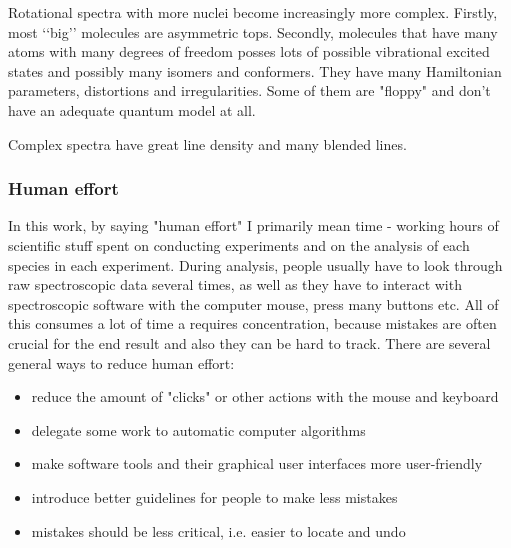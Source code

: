 Rotational spectra with more nuclei become increasingly more complex. Firstly, most \lq\lq{}big\rq\rq{} molecules are asymmetric tops. Secondly,  molecules that have many atoms with many degrees of freedom posses lots of possible vibrational excited states and possibly many isomers and conformers. They have many Hamiltonian parameters, distortions and irregularities. Some of them are "floppy" and don't have an adequate quantum model at all.

Complex spectra have great line density and many blended lines.

\subsubsection{Human effort}

In this work, by saying "human effort" I primarily mean time - working hours of scientific stuff spent on conducting experiments and on the analysis of each species in each experiment. During analysis, people usually have to look through raw spectroscopic data several times, as well as they have to interact with spectroscopic software with the computer mouse, press many buttons etc. All of this consumes a lot of time a requires concentration, because mistakes are often crucial for the end result and also they can be hard to track. There are several general ways to reduce human effort:
\begin{itemize}
 	\item reduce the amount of "clicks" or other actions with the mouse and keyboard
	\item delegate some work to automatic computer algorithms 
	\item make software tools and their graphical user interfaces more user-friendly
	\item introduce better guidelines for people to make less mistakes
	\item mistakes should be less critical, i.e. easier to locate and undo
\end{itemize}


